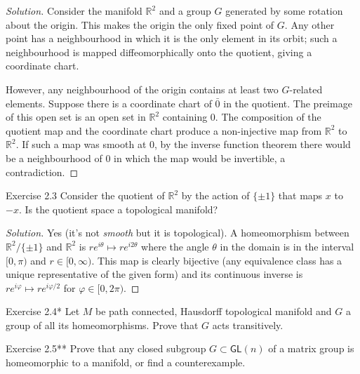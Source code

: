 \begin{proof}[Solution]\leavevmode
Consider the manifold $\mathbb{R}^2$ and a group $G$ generated by some rotation about the origin. This makes the origin the only fixed point of $G$. Any other point has a neighbourhood in which it is the only element in its orbit; such a neighbourhood is mapped diffeomorphically onto the quotient, giving a coordinate chart.

However, any neighbourhood of the origin contains at least two $G$-related elements.  Suppose there is a  coordinate chart of $\bar{0} $ in the quotient. The preimage of this open set is an open set in $\mathbb{R}^2$ containing $0$. The composition of the quotient map and the coordinate chart produce a non-injective map from  $\mathbb{R}^2$ to $\mathbb{R}^2$. If such a map was smooth at $0$, by the inverse function theorem there would be a  neighbourhood of $0$ in which the map would be invertible, a contradiction.
\end{proof}

\begin{thing4}{Exercise 2.3}\label{exer:2.3}\leavevmode
Consider the quotient of  $\mathbb{R}^2$ by the action of $\{\pm  1\}$ that maps $x$ to  $-x$. Is the quotient space a topological manifold?
\end{thing4}

\begin{proof}[Solution]\leavevmode
	Yes (it's not \textit{smooth} but it is topological). A homeomorphism between $\mathbb{R}^2/\{\pm 1\}$ and $\mathbb{R}^2$ is $re^{i\theta}\mapsto re^{i2\theta}$ where the angle $\theta$ in the domain is in the interval  $[0,\pi)$ and  $r\in [0,\infty)$. This map is clearly bijective (any equivalence class has a unique representative of the given form) and its continuous inverse is $re^{i\varphi}\mapsto re^{i\varphi/2}$ for $\varphi \in [0,2\pi)$.
\end{proof}

\begin{thing4}{Exercise 2.4*}\label{exer:2.4}\leavevmode
Let $M$ be path connected, Hausdorff topological manifold and $G$ a group of all its homeomorphisms. Prove that $G$ acts transitively.
\end{thing4}

\begin{thing4}{Exercise 2.5**}\label{exer:2.5}\leavevmode
Prove that any closed subgroup $G \subset \mathsf{GL}(n)$ of a matrix group is homeomorphic to a manifold, or find a counterexample.
\end{thing4}

